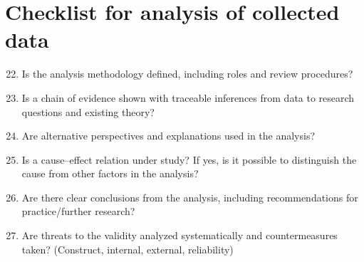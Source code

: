 \section{Checklist for analysis of collected data}
\begin{tcolorbox}[colback=black!5!white,colframe=black!75!white,title=Checklist for Preparation for data collection \cite{runeson2009guidelines}]
\begin{enumerate}
    \setcounter{enumi}{21}
    \item Is the analysis methodology defined, including roles and review procedures?
    \item Is a chain of evidence shown with traceable inferences from data to research
    questions and existing theory?
    \item Are alternative perspectives and explanations used in the analysis?
    \item Is a cause–effect relation under study? If yes, is it possible to distinguish the
    cause from other factors in the analysis?
    \item Are there clear conclusions from the analysis, including recommendations for
    practice/further research?
    \item Are threats to the validity analyzed systematically and countermeasures taken? (Construct, internal, external, reliability)
\end{enumerate}
\end{tcolorbox}

